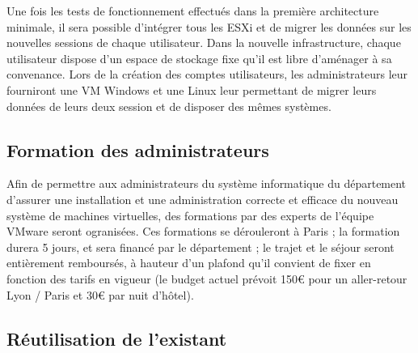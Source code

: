 Une fois les tests de fonctionnement effectués dans la première architecture minimale, il sera possible d’intégrer tous les ESXi et de migrer les données sur les nouvelles sessions de chaque utilisateur. Dans la nouvelle infrastructure, chaque utilisateur dispose d’un espace de stockage fixe qu’il est libre d’aménager à sa convenance. Lors de la création des comptes utilisateurs, les administrateurs leur fourniront une VM Windows et une Linux leur permettant de migrer leurs données de leurs deux session et de disposer des mêmes systèmes. \\

\subsection{Formation des administrateurs}

Afin de permettre aux administrateurs du système informatique du département d’assurer une installation et une administration correcte et efficace du nouveau système de machines virtuelles, des formations par des experts de l’équipe VMware seront ogranisées. Ces formations se dérouleront à Paris ; la formation durera 5 jours, et sera financé par le département ; le trajet et le séjour seront entièrement remboursés, à hauteur d’un plafond qu’il convient de fixer en fonction des tarifs en vigueur (le budget actuel prévoit 150€ pour un aller-retour Lyon / Paris et 30€ par nuit d’hôtel).

\subsection{Réutilisation de l'existant}

